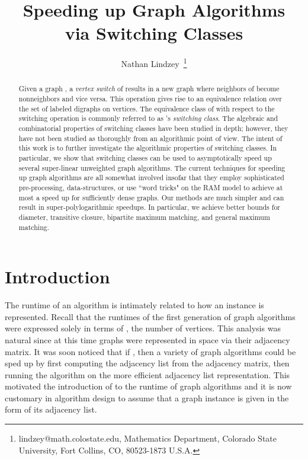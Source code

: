 \documentclass{llncs}
\begin{document}
\frenchspacing


\title{\Large Speeding up Graph Algorithms\\ via Switching Classes}
\author{Nathan Lindzey~\thanks{lindzey@math.colostate.edu,
Mathematics Department,
Colorado State University,
Fort Collins, CO, 80523-1873
U.S.A.}
}
\date{}
\maketitle


\begin{abstract} \small\baselineskip=9pt 
Given a graph , a \emph{vertex switch} of  results in a new graph where neighbors of  become nonneighbors and vice versa.  This operation gives rise to an equivalence relation over the set of labeled digraphs on  vertices.  The equivalence class of  with respect to the switching operation is commonly referred to as 's \emph{switching class}. The algebraic and combinatorial properties of switching classes have been studied in depth; however, they have not been studied as thoroughly from an algorithmic point of view.  The intent of this work is to further investigate the algorithmic properties of switching classes. In particular, we show that switching classes can be used to asymptotically speed up several super-linear unweighted graph algorithms. The current techniques for speeding up graph algorithms are all somewhat involved insofar that they employ sophisticated pre-processing, data-structures, or use ``word tricks" on the RAM model to achieve at most a  speed up for sufficiently dense graphs.  Our methods are much simpler and can result in super-polylogarithmic speedups. In particular, we achieve better bounds for diameter, transitive closure, bipartite maximum matching, and general maximum matching.
\end{abstract}

\section{Introduction}

The runtime of an algorithm is intimately related to how an instance is represented.  
Recall that the runtimes of the first generation of graph algorithms were expressed solely in terms of , the number of vertices.  This analysis was natural since at this time graphs were represented in  space via their adjacency matrix.  It was soon noticed that if , then a variety of graph algorithms could be sped up by first computing the adjacency list from the adjacency matrix, then running the algorithm on the more efficient adjacency list representation. This motivated the introduction of  to the runtime of graph algorithms and it is now customary in algorithm design to assume that a graph instance is given in the form of its adjacency list. 
\end{document}
